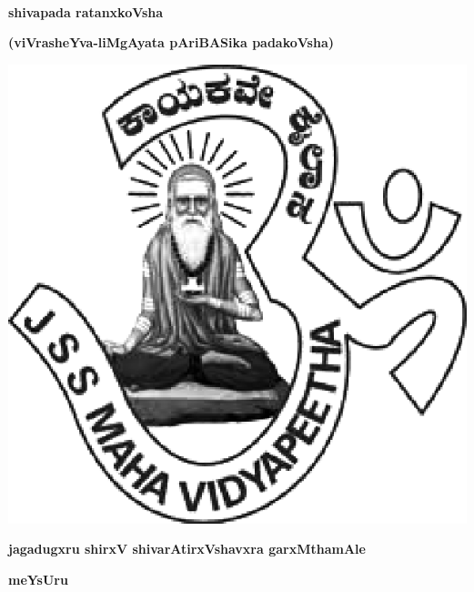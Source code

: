 ~\thispagestyle{empty}

\vfill

\begin{center}
{\fontsize{50}{50}\selectfont\bfseries shivapada ratanxkoVsha}\relax

\medskip

{\LARGE\bfseries (viVrasheYva-liMgAyata pAriBASika padakoVsha)}
\end{center}

\vfill



\vfill


\centerline{\includegraphics[scale=.3]{JSSlogo.eps}}

\medskip

\centerline{\large\bfseries jagadugxru shirxV shivarAtirxVshavxra  garxMthamAle}

\smallskip

\centerline{\large\bfseries meYsUru}
